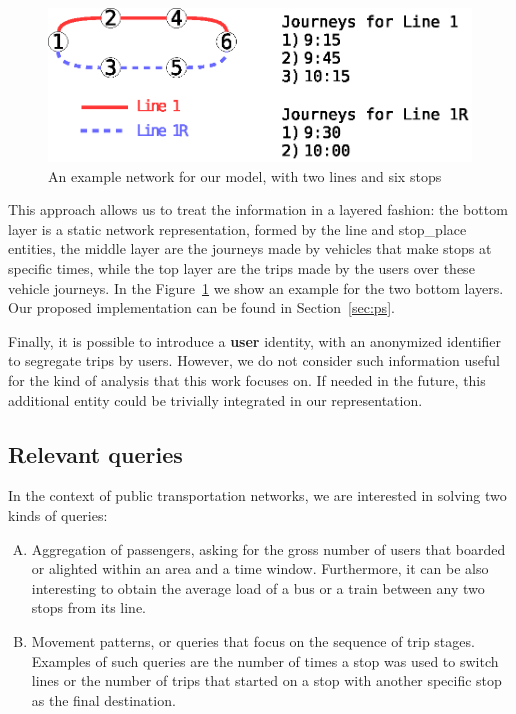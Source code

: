 \documentclass[runningheads]{llncs}
\begin{document}
\begin{figure}
\includegraphics[width=\textwidth]{example_network.eps}
\caption{An example network for our model, with two lines and six stops}
\label{fig:example_network}
\end{figure}

This approach allows us to treat the information in a layered fashion: the bottom layer is a static network representation, formed by the line and stop\_place entities, the middle layer are the journeys made by vehicles that make stops at specific times, while the top layer are the trips made by the users over these vehicle journeys. In the Figure~\ref{fig:example_network} we show an example for the two bottom layers. Our proposed implementation can be found in Section~\ref{sec:ps}.

Finally, it is possible to introduce a \textbf{user} identity, with an anonymized identifier to segregate trips by users. However, we do not consider such information useful for the kind of analysis that this work focuses on. If needed in the future, this additional entity could be trivially integrated in our representation.

\subsection{Relevant queries}
\label{sec:rq}
In the context of public transportation networks, we are interested in solving two kinds of queries:

\begin{enumerate}[A)]
    \item Aggregation of passengers, asking for the gross number of users that boarded or alighted within an area and a time window. Furthermore, it can be also interesting to obtain the average load of a bus or a train between any two stops from its line.
    \item Movement patterns, or queries that focus on the sequence of trip stages. Examples of such queries are the number of times a stop was used to switch lines or the number of trips that started on a stop with another specific stop as the final destination. 
\end{enumerate}
\end{document}
